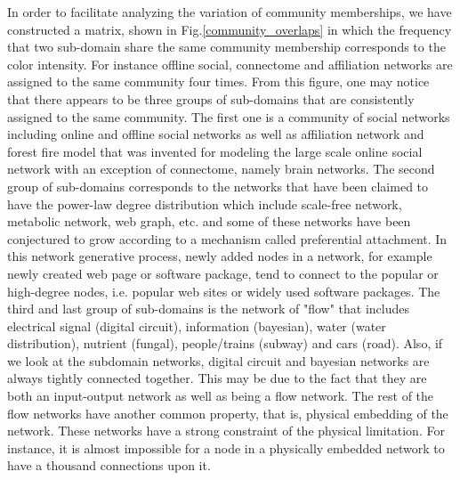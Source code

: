 \documentclass{article}
\begin{document}
In order to facilitate analyzing the variation of community memberships, we have constructed a matrix, shown in Fig.\ref{community_overlaps} in which the frequency that two sub-domain share the same community membership corresponds to the color intensity. For instance offline social, connectome and affiliation networks are assigned to the same community four times. From this figure, one may notice that there appears to be three groups of sub-domains that are consistently assigned to the same community. The first one is a community of social networks including online and offline social networks as well as affiliation network and forest fire model  that was invented for modeling the large scale online social network with an exception of connectome, namely brain networks. The second group of sub-domains corresponds to the networks that have been claimed to have the power-law degree distribution which include scale-free network, metabolic network, web graph, etc. and some of these networks have been conjectured to grow according to a mechanism called preferential attachment. In this network generative process, newly added nodes in a network, for example newly created web page or software package, tend to connect to the popular or high-degree nodes, i.e. popular web sites or widely used software packages. The third and last group of sub-domains is the network of "flow" that includes electrical signal (digital circuit), information (bayesian), water (water distribution), nutrient (fungal), people/trains (subway) and cars (road).  Also, if we look at the subdomain networks, digital circuit and bayesian networks are always tightly connected together. This may be due to the fact that they are both an input-output network as well as being a flow network. The rest of the flow networks have another common property, that is, physical embedding of the network. These networks have a strong constraint of the physical limitation. For instance, it is almost impossible for a node in a physically embedded network to have a thousand connections upon it.
\end{document}
